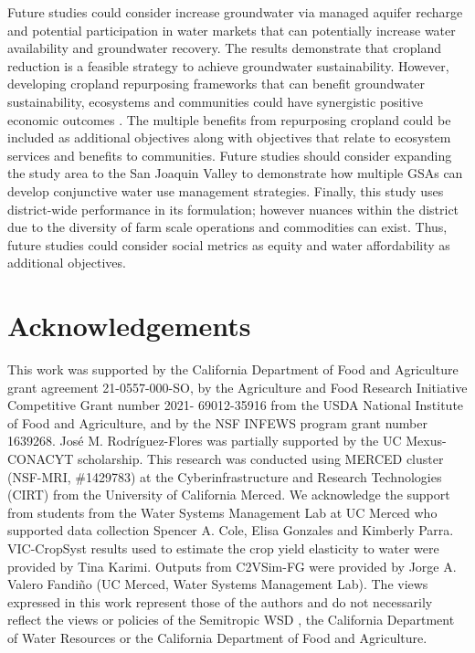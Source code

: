 \documentclass[a4paper,fleqn]{cas-sc}
\begin{document}
Future studies could consider increase groundwater via managed aquifer recharge \citep{alam_can_2020} and potential participation in water markets \citep{arellano-gonzalez_adaptive_2021,hanak_water_2019} that can potentially increase water availability and groundwater recovery. The results demonstrate that cropland reduction is a feasible strategy to achieve groundwater sustainability. However, developing cropland repurposing frameworks that can benefit groundwater sustainability, ecosystems and communities could have synergistic positive economic outcomes \citep{biggs_landowner_2022,fernandez-bou_water_2023,espinoza_fallow_2023}. The multiple benefits from repurposing cropland could be included as additional objectives along with objectives that relate to ecosystem services and benefits to communities. Future studies should consider expanding the study area to the San Joaquin Valley to demonstrate how multiple GSAs can develop conjunctive water use management strategies. Finally, this study uses district-wide performance in its formulation; however nuances within the district due to the diversity of farm scale operations and commodities can exist. Thus, future studies could consider social metrics as equity and water affordability as additional objectives.  

\section*{Acknowledgements}

This work was supported by the California Department of Food and Agriculture grant agreement 21-0557-000-SO, by the Agriculture and Food Research Initiative Competitive Grant number 2021- 69012-35916 from the USDA National Institute of Food and Agriculture, and by the NSF INFEWS program grant number 1639268. José M. Rodríguez-Flores was partially supported by the UC Mexus-CONACYT scholarship. This research was conducted using MERCED cluster (NSF-MRI, \#1429783) at the Cyberinfrastructure and Research Technologies (CIRT) from the University of California Merced. We acknowledge the support from students from the Water Systems Management Lab at UC Merced who supported data collection Spencer A. Cole, Elisa Gonzales and Kimberly Parra. VIC-CropSyst results used to estimate the crop yield elasticity to water were provided by Tina Karimi. Outputs from  C2VSim-FG were provided by Jorge A. Valero Fandiño (UC Merced, Water Systems Management Lab). The views expressed in this work represent those of the authors and do not necessarily reflect the views or policies of the Semitropic WSD , the California Department of Water Resources or the California Department of Food and Agriculture. 
\end{document}
